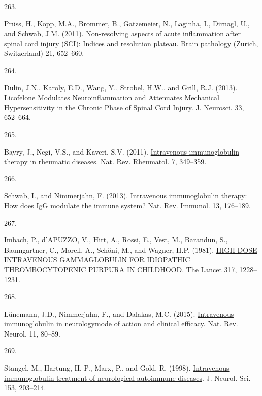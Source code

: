 \documentclass[
]{article}
\newlength{\cslhangindent}
\newlength{\csllabelwidth}
\newlength{\cslentryspacingunit} %
\newenvironment{CSLReferences}[2] %
 {%
  \setlength{\parindent}{0pt}
  \ifodd #1
  \let\oldpar\par
  \def\par{\hangindent=\cslhangindent\oldpar}
  \fi
  \setlength{\parskip}{#2\cslentryspacingunit}
 }%
 {}
\newcommand{\CSLLeftMargin}[1]{\parbox[t]{\csllabelwidth}{#1}}
\newcommand{\CSLRightInline}[1]{\parbox[t]{\linewidth - \csllabelwidth}{#1}\break}
\begin{document}
\begin{CSLReferences}{0}{0}
\leavevmode{}%
\CSLLeftMargin{263. }
\CSLRightInline{Prüss, H., Kopp, M.A., Brommer, B., Gatzemeier, N., Laginha, I., Dirnagl, U., and Schwab, J.M. (2011). \href{https://doi.org/10.1111/j.1750-3639.2011.00488.x}{Non-resolving aspects of acute inflammation after spinal cord injury ({SCI}): Indices and resolution plateau}. Brain pathology (Zurich, Switzerland) 21, 652--660.}

\leavevmode{}%
\CSLLeftMargin{264. }
\CSLRightInline{Dulin, J.N., Karoly, E.D., Wang, Y., Strobel, H.W., and Grill, R.J. (2013). \href{https://doi.org/10.1523/JNEUROSCI.6128-11.2013}{Licofelone {Modulates Neuroinflammation} and {Attenuates Mechanical Hypersensitivity} in the {Chronic Phase} of {Spinal Cord Injury}}. J. Neurosci. 33, 652--664.}

\leavevmode{}%
\CSLLeftMargin{265. }
\CSLRightInline{Bayry, J., Negi, V.S., and Kaveri, S.V. (2011). \href{https://doi.org/10.1038/nrrheum.2011.61}{Intravenous immunoglobulin therapy in rheumatic diseases}. Nat. Rev. Rheumatol. 7, 349--359.}

\leavevmode{}%
\CSLLeftMargin{266. }
\CSLRightInline{Schwab, I., and Nimmerjahn, F. (2013). \href{https://doi.org/10.1038/nri3401}{Intravenous immunoglobulin therapy: How does {IgG} modulate the immune system?} Nat. Rev. Immunol. 13, 176--189.}

\leavevmode{}%
\CSLLeftMargin{267. }
\CSLRightInline{Imbach, P., d'APUZZO, V., Hirt, A., Rossi, E., Vest, M., Barandun, S., Baumgartner, C., Morell, A., Schöni, M., and Wagner, H.P. (1981). \href{https://doi.org/10.1016/S0140-6736(81)92400-4}{{HIGH-DOSE INTRAVENOUS GAMMAGLOBULIN FOR IDIOPATHIC THROMBOCYTOPENIC PURPURA IN CHILDHOOD}}. The Lancet 317, 1228--1231.}

\leavevmode{}%
\CSLLeftMargin{268. }
\CSLRightInline{Lünemann, J.D., Nimmerjahn, F., and Dalakas, M.C. (2015). \href{https://doi.org/10.1038/nrneurol.2014.253}{Intravenous immunoglobulin in neurology\textemdash mode of action and clinical efficacy}. Nat. Rev. Neurol. 11, 80--89.}

\leavevmode{}%
\CSLLeftMargin{269. }
\CSLRightInline{Stangel, M., Hartung, H.-P., Marx, P., and Gold, R. (1998). \href{https://doi.org/10.1016/S0022-510X(97)00292-X}{Intravenous immunoglobulin treatment of neurological autoimmune diseases}. J. Neurol. Sci. 153, 203--214.}


\end{CSLReferences}
\end{document}
